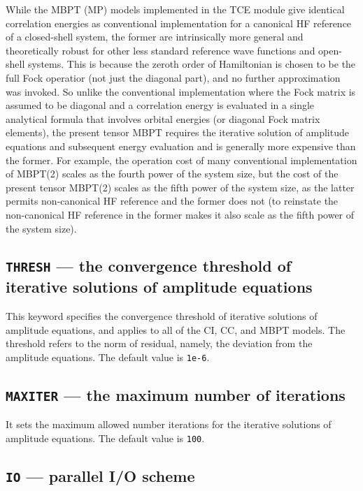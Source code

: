 While the MBPT (MP) models implemented in the TCE module give identical correlation energies as 
conventional implementation for a canonical HF reference of a closed-shell system, the former are intrinsically
more general and theoretically robust for other less standard reference wave functions and open-shell systems.
This is because the zeroth order of Hamiltonian is chosen to be the full Fock operatior (not just the diagonal
part), and no further approximation was invoked.  So unlike the conventional implementation where the Fock
matrix is assumed to be diagonal and a correlation energy is evaluated in a single analytical formula that involves
orbital energies (or diagonal Fock matrix elements), the present tensor MBPT requires the iterative solution
of amplitude equations and subsequent energy evaluation and is generally more expensive than the former.
For example, the operation cost of many conventional implementation of MBPT(2) scales as the fourth power 
of the system size, but the cost of the present tensor MBPT(2) scales as the fifth power of the system size,
as the latter permits non-canonical HF reference and the former does not (to reinstate the non-canonical HF 
reference in the former makes it also scale as the fifth power of the system size).

\subsection{{\tt THRESH} --- the convergence threshold of iterative solutions of amplitude equations}

This keyword specifies the convergence threshold of iterative solutions of amplitude equations,
and applies to all of the CI, CC, and MBPT models.
The threshold refers to the norm of residual,
namely, the deviation from the amplitude equations.
The default value is \verb+1e-6+.

\subsection{{\tt MAXITER} --- the maximum number of iterations}

It sets the maximum allowed number iterations for the iterative solutions of amplitude equations.
The default value is \verb+100+.

\subsection{{\tt IO} --- parallel I/O scheme}

